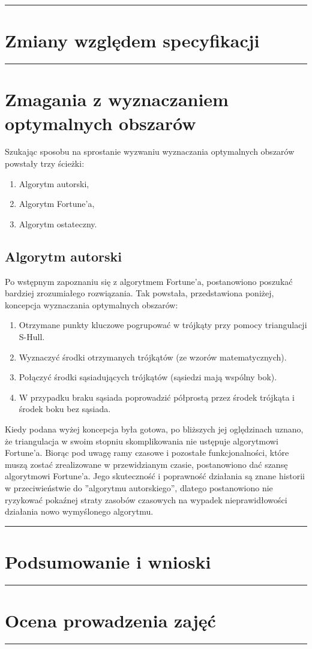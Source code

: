 \documentclass[a4paper,11pt]{article}
\newcommand{\linia}{\rule{\linewidth}{0.4mm}}
\begin{document}
\noindent\linia
\section{Zmiany względem specyfikacji}

\noindent\linia
\section{Zmagania z wyznaczaniem optymalnych obszarów}
Szukając sposobu na sprostanie wyzwaniu wyznaczania optymalnych obszarów powstały trzy ścieżki:
\begin{enumerate}
\item Algorytm autorski,
\item Algorytm Fortune'a,
\item Algorytm ostateczny.
\end{enumerate}
\subsection{Algorytm autorski}
Po wstępnym zapoznaniu się z algorytmem Fortune'a, postanowiono poszukać bardziej zrozumiałego rozwiązania.
Tak powstała, przedstawiona poniżej, koncepcja wyznaczania optymalnych obszarów:
\begin{enumerate}
\item Otrzymane punkty kluczowe pogrupować w trójkąty przy pomocy triangulacji S-Hull.
\item Wyznaczyć środki otrzymanych trójkątów (ze wzorów matematycznych).
\item Połączyć środki sąsiadujących trójkątów (sąsiedzi mają wspólny bok).
\item W przypadku braku sąsiada poprowadzić półprostą przez środek trójkąta i środek boku bez sąsiada.
\end{enumerate}
Kiedy podana wyżej koncepcja była gotowa, po bliższych jej oględzinach uznano, że triangulacja w swoim stopniu skomplikowania nie ustępuje algorytmowi Fortune'a.
Biorąc pod uwagę ramy czasowe i pozostałe funkcjonalności, które muszą zostać zrealizowane w przewidzianym czasie, postanowiono dać szansę algorytmowi Fortune'a. Jego skuteczność i poprawność działania są znane historii w przeciwieństwie do ''algorytmu autorskiego'', dlatego postanowiono nie ryzykować pokaźnej straty zasobów czasowych na wypadek nieprawidłowości działania nowo wymyślonego algorytmu.
\noindent\linia
\section{Podsumowanie i wnioski}

\noindent\linia
\section{Ocena prowadzenia zajęć}

\noindent\linia
\end{document}
